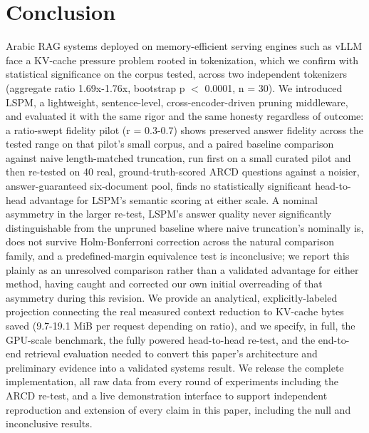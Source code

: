 \documentclass[pdflatex,sn-basic,Numbered]{sn-jnl}
\begin{document}
\section{Conclusion}
Arabic RAG systems deployed on memory-efficient serving engines such as vLLM face a KV-cache pressure problem rooted in tokenization, which we confirm with statistical significance on the corpus tested, across two independent tokenizers (aggregate ratio 1.69x-1.76x, bootstrap p $<$ 0.0001, n = 30). We introduced LSPM, a lightweight, sentence-level, cross-encoder-driven pruning middleware, and evaluated it with the same rigor and the same honesty regardless of outcome: a ratio-swept fidelity pilot (r = 0.3-0.7) shows preserved answer fidelity across the tested range on that pilot's small corpus, and a paired baseline comparison against naive length-matched truncation, run first on a small curated pilot and then re-tested on 40 real, ground-truth-scored ARCD questions against a noisier, answer-guaranteed six-document pool, finds no statistically significant head-to-head advantage for LSPM's semantic scoring at either scale. A nominal asymmetry in the larger re-test, LSPM's answer quality never significantly distinguishable from the unpruned baseline where naive truncation's nominally is, does not survive Holm-Bonferroni correction across the natural comparison family, and a predefined-margin equivalence test is inconclusive; we report this plainly as an unresolved comparison rather than a validated advantage for either method, having caught and corrected our own initial overreading of that asymmetry during this revision. We provide an analytical, explicitly-labeled projection connecting the real measured context reduction to KV-cache bytes saved (9.7-19.1 MiB per request depending on ratio), and we specify, in full, the GPU-scale benchmark, the fully powered head-to-head re-test, and the end-to-end retrieval evaluation needed to convert this paper's architecture and preliminary evidence into a validated systems result. We release the complete implementation, all raw data from every round of experiments including the ARCD re-test, and a live demonstration interface to support independent reproduction and extension of every claim in this paper, including the null and inconclusive results.
\end{document}
